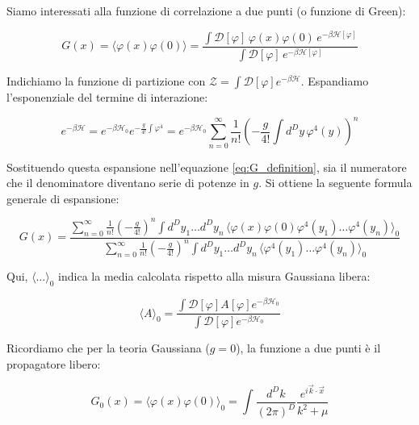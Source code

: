 Siamo interessati alla funzione di correlazione a due punti (o funzione di Green):

\begin{equation}
    G(x) = \langle \varphi(x)\varphi(0) \rangle = \frac{\int \mathcal{D}[\varphi] \, \varphi(x)\varphi(0) \, e^{-\beta \mathcal{H}[\varphi]}}{\int \mathcal{D}[\varphi] \, e^{-\beta \mathcal{H}[\varphi]}}
    \label{eq:G_definition}
\end{equation}

Indichiamo la funzione di partizione con $\mathcal{Z} = \int \mathcal{D}[\varphi] e^{-\beta \mathcal{H}}$.
Espandiamo l'esponenziale del termine di interazione:

\begin{equation}
    e^{-\beta \mathcal{H}} = e^{-\beta \mathcal{H}_0} e^{-\frac{g}{4!} \int \varphi^4} = e^{-\beta \mathcal{H}_0} \sum_{n=0}^{\infty} \frac{1}{n!} \left( -\frac{g}{4!} \int d^D y \, \varphi^4(y) \right)^n
\end{equation}

Sostituendo questa espansione nell'equazione \eqref{eq:G_definition}, sia il numeratore che il denominatore diventano serie di potenze in $g$.
Si ottiene la seguente formula generale di espansione:

\begin{tcolorbox}[colback=colorA!10, colframe=colorB!60!colorA,  title=\textbf{Formula di Espansione}]
\begin{equation}
    G(x) = \frac{\sum_{n=0}^\infty \frac{1}{n!} \left(-\frac{g}{4!}\right)^n \int d^D y_1 \dots d^D y_n \, \langle \varphi(x)\varphi(0) \varphi^4(y_1) \dots \varphi^4(y_n) \rangle_0}{\sum_{n=0}^\infty \frac{1}{n!} \left(-\frac{g}{4!}\right)^n \int d^D y_1 \dots d^D y_n \, \langle \varphi^4(y_1) \dots \varphi^4(y_n) \rangle_0}
    \label{eq:expansion_formula}
\end{equation}
\end{tcolorbox}

Qui, $\langle \dots \rangle_0$ indica la media calcolata rispetto alla misura Gaussiana libera:

\begin{equation}
    \langle A \rangle_0 = \frac{\int \mathcal{D}[\varphi] A[\varphi] e^{-\beta \mathcal{H}_0}}{\int \mathcal{D}[\varphi] e^{-\beta \mathcal{H}_0}}
\end{equation}

Ricordiamo che per la teoria Gaussiana ($g=0$), la funzione a due punti è il propagatore libero:

\begin{equation}
    G_0(x) = \langle \varphi(x)\varphi(0) \rangle_0 = \int \frac{d^D k}{(2\pi)^D} \frac{e^{i \vec{k} \cdot \vec{x}}}{k^2 + \mu}
\end{equation}

